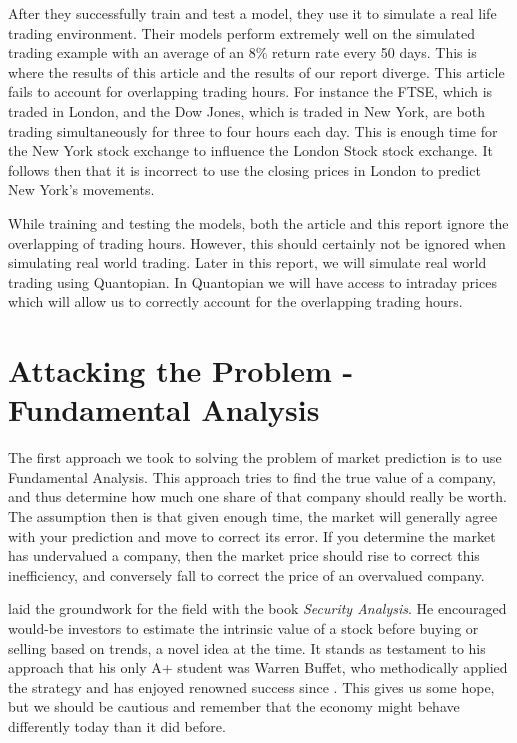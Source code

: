 \documentclass{report}
\begin{document}
After they successfully train and test a model, they use it to simulate a real life trading environment. Their models perform extremely well on the simulated trading example with an average of an 8\% return rate every 50 days. This is where the results of this article and the results of our report diverge. This article fails to account for overlapping trading hours. For instance the FTSE, which is traded in London, and the Dow Jones, which is traded in New York, are both trading simultaneously for three to four hours each day. This is enough time for the New York stock exchange to influence the London Stock stock exchange. It follows then that it is incorrect to use the closing prices in London to predict New York's movements.

While training and testing the models, both the article and this report ignore the overlapping of trading hours. However, this should certainly not be ignored when simulating real world trading. Later in this report, we will simulate real world trading using Quantopian. In Quantopian we will have access to intraday prices which will allow us to correctly account for the overlapping trading hours.  

\chapter{Attacking the Problem - Fundamental Analysis}

The first approach we took to solving the problem of market prediction is to use Fundamental Analysis. This approach tries to find the true value of a company, and thus determine how much one share of that company should really be worth. The assumption then is that given enough time, the market will generally agree with your prediction and move to correct its error. If you determine the market has undervalued a company, then the market price should rise to correct this inefficiency, and conversely fall to correct the price of an overvalued company. 

\citet{graham1934security} laid the groundwork for the field with the book \textit{Security Analysis}. He encouraged would-be investors to estimate the intrinsic value of a stock before buying or selling based on trends, a novel idea at the time. It stands as testament to his approach that his only A+ student was Warren Buffet, who methodically applied the strategy and has enjoyed renowned success since \cite{schroeder2008snowball}. This gives us some hope, but we should be cautious and remember that the economy might behave differently today than it did before.
\end{document}
